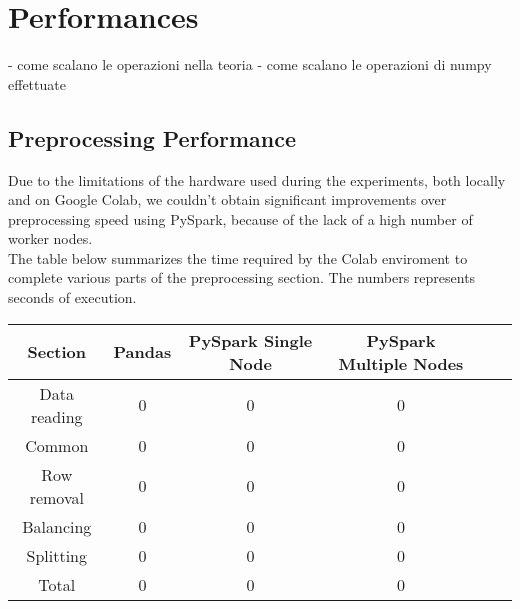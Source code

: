 \documentclass[
	letterpaper, %
	10pt, %
]{class}
\begin{document}



\section{Performances}

- come scalano le operazioni nella teoria
- come scalano le operazioni di numpy effettuate

\subsection{Preprocessing Performance}

Due to the limitations of the hardware used during the experiments, both locally and on Google Colab, we couldn't obtain significant improvements over preprocessing speed using PySpark, because of the lack of a high number of worker nodes.\\

The table below summarizes the time required by the Colab enviroment to complete various parts of the preprocessing section.
The numbers represents seconds of execution.

\begin{center}
	\begin{tabular}{ |c|c|c|c|c|c| }
		\hline
		Section      & Pandas & PySpark Single Node & PySpark Multiple Nodes \\
		\hline
		Data reading & 0      & 0                   & 0                      \\
		Common       & 0      & 0                   & 0                      \\
		Row removal  & 0      & 0                   & 0                      \\
		Balancing    & 0      & 0                   & 0                      \\
		Splitting    & 0      & 0                   & 0                      \\
		Total        & 0      & 0                   & 0                      \\

		\hline
	\end{tabular}
\end{center}
\end{document}

